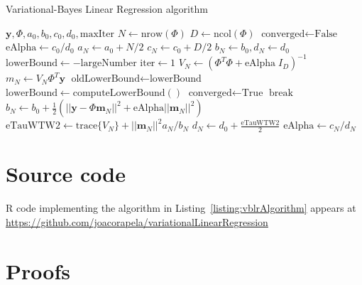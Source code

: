 \documentclass[12pt]{article}
\begin{document}
\begin{algorithm}
\caption{Variational-Bayes Linear Regression algorithm}
\label{listing:vblrAlgorithm}

\begin{algorithmic}[1]
\REQUIRE $\mathbf{y}, \Phi, a_0, b_0, c_0, d_0, \text{maxIter}$
\STATE $N\leftarrow\text{nrow}(\Phi)$
\STATE $D\leftarrow\text{ncol}(\Phi)$
\STATE $\text{converged}\leftarrow\text{False}$
\STATE $\text{eAlpha}\leftarrow c_0/d_0$
\STATE $a_N\leftarrow a_0+N/2$
\STATE $c_N\leftarrow c_0+D/2$
\STATE $b_N\leftarrow b_0, d_N\leftarrow d_0$
\STATE $\text{lowerBound}\leftarrow -\text{largeNumber}$
\STATE $\text{iter}\leftarrow 1$
    \STATE $V_N\leftarrow(\Phi^T\Phi+\text{eAlpha}\;I_D)^{-1}$
    \STATE $m_N\leftarrow V_N\Phi^T\mathbf{y}$
    \STATE $\text{oldLowerBound}\leftarrow\text{lowerBound}$
    \STATE $\text{lowerBound}\leftarrow\text{computeLowerBound}()$
        \STATE $\text{converged}\leftarrow\text{True}$
        \STATE $\text{break}$
    \ENDIF
    \STATE $b_N\leftarrow b_0+\frac{1}{2}(||\mathbf{y}-\Phi\mathbf{m}_N||^2+\text{eAlpha}||\mathbf{m}_N||^2)$
    \STATE $\text{eTauWTW2}\leftarrow \text{trace}\{V_N\}+||\mathbf{m}_N||^2a_N/b_N$
    \STATE $d_N\leftarrow d_0+\frac{\text{eTauWTW2}}{2}$
    \STATE $\text{eAlpha}\leftarrow c_N/d_N$
\ENDFOR
{}
\end{algorithmic}
\end{algorithm}

\section{Source code}

\begin{flushleft}
R code implementing the algorithm in Listing~\ref{listing:vblrAlgorithm}
appears at\\
\url{https://github.com/joacorapela/variationalLinearRegression}\\
\end{flushleft}




\appendix

\section{Proofs}
\end{document}
